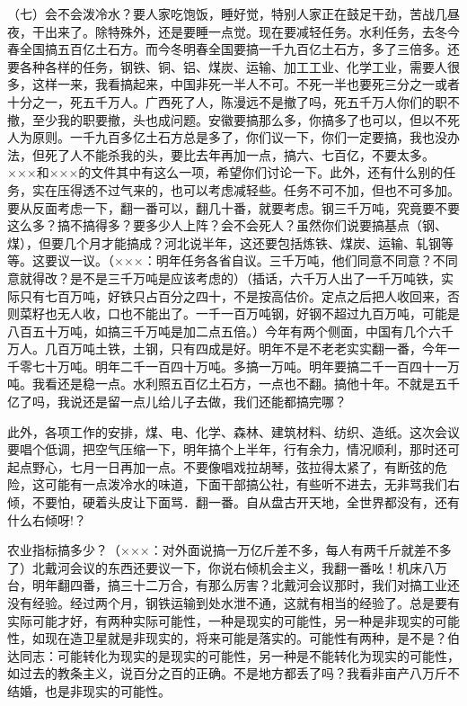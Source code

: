 （七）会不会泼冷水？要人家吃饱饭，睡好觉，特别人家正在鼓足干劲，苦战几昼夜，干出来了。除特殊外，还是要睡一点觉。现在要减轻任务。水利任务，去冬今春全国搞五百亿土石方。而今冬明春全国要搞一千九百亿土石方，多了三倍多。还要各种各样的任务，钢铁、铜、铝、煤炭、运输、加工工业、化学工业，需要人很多，这样一来，我看搞起来，中国非死一半人不可。不死一半也要死三分之一或者十分之一，死五千万人。广西死了人，陈漫远不是撤了吗，死五千万人你们的职不撤，至少我的职要撤，头也成问题。安徽要搞那么多，你搞多了也可以，但以不死人为原则。一千九百多亿土石方总是多了，你们议一下，你们一定要搞，我也没办法，但死了人不能杀我的头，要比去年再加一点，搞六、七百亿，不要太多。×××和×××的文件其中有这么一项，希望你们讨论一下。此外，还有什么别的任务，实在压得透不过气来的，也可以考虑减轻些。任务不可不加，但也不可多加。要从反面考虑一下，翻一番可以，翻几十番，就要考虑。钢三千万吨，究竟要不要这么多？搞不搞得多？要多少人上阵？会不会死人？虽然你们说要搞基点（钢、煤），但要几个月才能搞成？河北说半年，这还要包括炼铁、煤炭、运输、轧钢等等。这要议一议。（×××：明年任务各省自议。三千万吨，他们同意不同意？不同意就得改？是不是三千万吨是应该考虑的）（插话，六千万人出了一千万吨铁，实际只有七百万吨，好铁只占百分之四十，不是按高估价。定点之后把人收回来，否则菜籽也无人收，口也不能出了。一千一百万吨钢，好钢不超过九百万吨，可能是八百五十万吨，如搞三千万吨是加二点五倍。）今年有两个侧面，中国有几个六千万人。几百万吨土铁，土钢，只有四成是好。明年不是不老老实实翻一番，今年一千零七十万吨。明年二千一百四十万吨。多搞一万吨。明年要搞二千一百四十一万吨。我看还是稳一点。水利照五百亿土石方，一点也不翻。搞他十年。不就是五千亿了吗，我说还是留一点儿给儿子去做，我们还能都搞完哪？

此外，各项工作的安排，煤、电、化学、森林、建筑材料、纺织、造纸。这次会议要唱个低调，把空气压缩一下，明年搞个上半年，行有余力，情况顺利，那时还可起点野心，七月一日再加一点。不要像唱戏拉胡琴，弦拉得太紧了，有断弦的危险，这可能有一点泼冷水的味道，下面干部搞公社，有些听不进去，无非骂我们右倾，不要怕，硬着头皮让下面骂．翻一番。自从盘古开天地，全世界都没有，还有什么右倾呀!？

农业指标搞多少？（×××：对外面说搞一万亿斤差不多，每人有两千斤就差不多了）北戴河会议的东西还要议一下，你说右倾机会主义，我翻一番吆！机床八万台，明年翻四番，搞三十二万合，有那么厉害？北戴河会议那时，我们对搞工业还没有经验。经过两个月，钢铁运输到处水泄不通，这就有相当的经验了。总是要有实际可能才好，有两种实际可能性，一种是现实的可能性，另一种是非现实的可能性，如现在造卫星就是非现实的，将来可能是落实的。可能性有两种，是不是？伯达同志：可能转化为现实的是现实的可能性，另一种是不能转化为现实的可能性，如过去的教条主义，说百分之百的正确。不是地方都丢了吗？我看非亩产八万斤不结婚，也是非现实的可能性。

